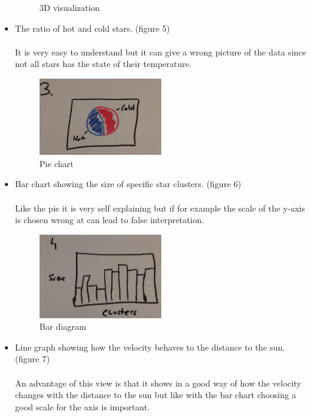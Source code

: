\documentclass{article}
\begin{document}
\begin{itemize}
\begin{figure}[!h]
	\caption{3D visualization}
	\label{fig4}
\end{figure}
\item The ratio of hot and cold stars. (figure 5)\\
\\
It is very easy to understand but it can give a wrong picture of the data since not all stars has the state of their temperature.
\begin{figure}[!h]
\centering
\includegraphics[width=0.5\textwidth]{images/HotColdRatio.jpg}
	\caption{Pie chart}
	\label{fig5}
\end{figure}
\newpage\item Bar chart showing the size of specific star clusters. (figure 6)\\
\\
Like the pie it is very self explaining but if for example the scale of the y-axis is chosen wrong at can lead to false interpretation.
\begin{figure}[!h]
\centering
\includegraphics[width=0.5\textwidth]{images/SizeClusters.jpg}
	\caption{Bar diagram}
	\label{fig6}
\end{figure}
\item Line graph showing how the velocity behaves to the distance to the sun. (figure 7)\\
\\
An advantage of this view is that it shows in a good way of how the velocity changes with the distance to the sun but like with the bar chart choosing a good scale for the axis is important.


\end{itemize}
\end{document}
